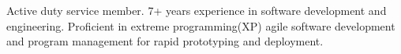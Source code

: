 

\begin{cvparagraph}

 Active duty service member. 7+ years experience in software development and engineering. Proficient in extreme programming(XP) agile software development and program management for rapid prototyping and deployment. 
\end{cvparagraph}
